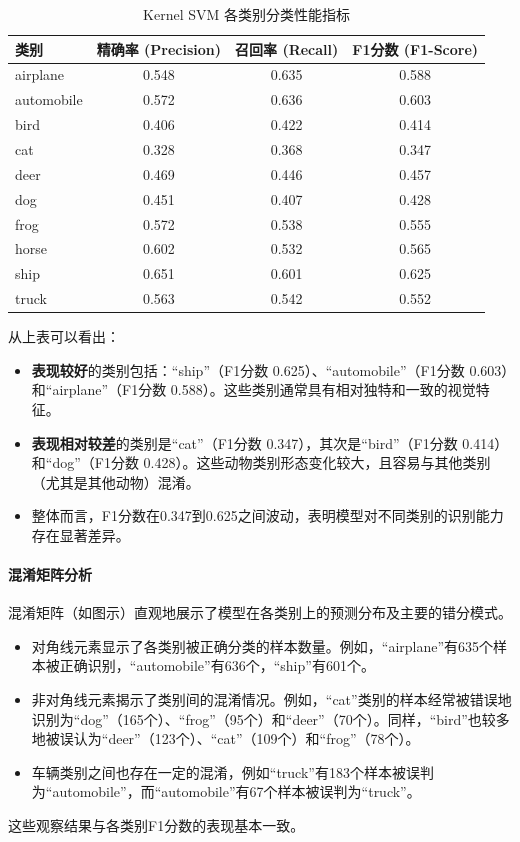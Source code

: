 \documentclass[UTF8]{report}
\theoremstyle{MyLineTheoremStyle} %
\theoremstyle{MyBlockTheoremStyle} %
\theoremstyle{MySubsubsectionStyle} %
\begin{document}
\begin{table}[H]
\centering
\caption{Kernel SVM 各类别分类性能指标}
\label{tab:svm_class_metrics_summary}
\begin{tabular}{l c c c}
\toprule
\textbf{类别} & \textbf{精确率 (Precision)} & \textbf{召回率 (Recall)} & \textbf{F1分数 (F1-Score)} \\
\midrule
airplane & 0.548 & 0.635 & 0.588 \\
automobile & 0.572 & 0.636 & 0.603 \\
bird & 0.406 & 0.422 & 0.414 \\
cat & 0.328 & 0.368 & 0.347 \\
deer & 0.469 & 0.446 & 0.457 \\
dog & 0.451 & 0.407 & 0.428 \\
frog & 0.572 & 0.538 & 0.555 \\
horse & 0.602 & 0.532 & 0.565 \\
ship & 0.651 & 0.601 & 0.625 \\
truck & 0.563 & 0.542 & 0.552 \\
\bottomrule
\end{tabular}
\end{table}

从上表可以看出：
\begin{itemize}
    \item \textbf{表现较好}的类别包括：“ship”（F1分数 0.625）、“automobile”（F1分数 0.603）和“airplane”（F1分数 0.588）。这些类别通常具有相对独特和一致的视觉特征。
    \item \textbf{表现相对较差}的类别是“cat”（F1分数 0.347），其次是“bird”（F1分数 0.414）和“dog”（F1分数 0.428）。这些动物类别形态变化较大，且容易与其他类别（尤其是其他动物）混淆。
    \item 整体而言，F1分数在0.347到0.625之间波动，表明模型对不同类别的识别能力存在显著差异。
\end{itemize}

\paragraph{混淆矩阵分析}
混淆矩阵（如图示）直观地展示了模型在各类别上的预测分布及主要的错分模式。
\begin{itemize}
    \item 对角线元素显示了各类别被正确分类的样本数量。例如，“airplane”有635个样本被正确识别，“automobile”有636个，“ship”有601个。
    \item 非对角线元素揭示了类别间的混淆情况。例如，“cat”类别的样本经常被错误地识别为“dog”（165个）、“frog”（95个）和“deer”（70个）。同样，“bird”也较多地被误认为“deer”（123个）、“cat”（109个）和“frog”（78个）。
    \item 车辆类别之间也存在一定的混淆，例如“truck”有183个样本被误判为“automobile”，而“automobile”有67个样本被误判为“truck”。
\end{itemize}
这些观察结果与各类别F1分数的表现基本一致。
\end{document}
